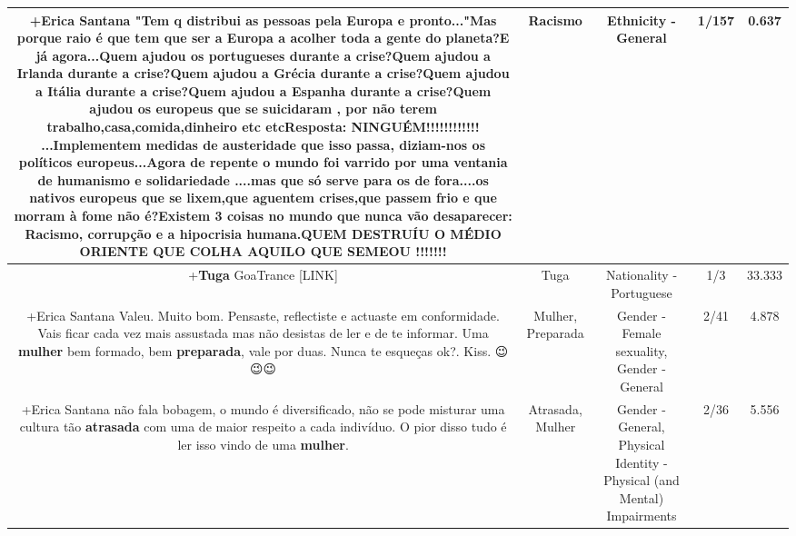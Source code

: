 \documentclass[11pt]{article}
\newlength\mylength
\begin{document}
\begin{center}
\begin{longtable}{|C{.65\mylength}|C{.30\mylength}|C{.12\mylength}|C{.12\mylength}|C{.12\mylength}|}
  \small +Erica Santana "Tem q  distribui as pessoas pela Europa e pronto..."Mas porque raio é que tem que ser a Europa a acolher toda a gente do planeta?E já agora...Quem ajudou os portugueses durante a crise?Quem ajudou a Irlanda  durante a crise?Quem ajudou a Grécia durante a crise?Quem ajudou a Itália durante a crise?Quem ajudou a Espanha durante a crise?Quem ajudou os europeus que se suicidaram , por não terem trabalho,casa,comida,dinheiro etc etcResposta:  NINGUÉM!!!!!!!!!!!! ...Implementem medidas de austeridade que isso passa, diziam-nos os políticos europeus...Agora de repente o mundo foi varrido por uma ventania de humanismo e solidariedade ....mas que só serve para os de fora....os nativos europeus que se lixem,que aguentem crises,que passem frio e que morram à fome não é?Existem 3 coisas no mundo que nunca vão desaparecer: \textbf{Racismo}, corrupção e a hipocrisia humana.QUEM DESTRUÍU O MÉDIO ORIENTE QUE COLHA AQUILO QUE SEMEOU !!!!!!!\normalsize   & Racismo & Ethnicity - General & 1/157 & 0.637 \\  \hline
  \small +\textbf{Tuga} GoaTrance  [LINK] \normalsize   & Tuga & Nationality - Portuguese & 1/3 & 33.333 \\  \hline
  \small +Erica Santana  Valeu. Muito bom. Pensaste, reflectiste e actuaste em conformidade. Vais ficar cada vez mais assustada mas não desistas de ler e de te informar. Uma \textbf{mulher} bem formado, bem \textbf{preparada}, vale por duas. Nunca te esqueças ok?. Kiss.  😉😉😉\normalsize   & Mulher, Preparada & Gender - Female sexuality, Gender - General & 2/41 & 4.878 \\  \hline
  \small +Erica Santana não fala bobagem, o mundo é diversificado, não se pode misturar uma cultura tão \textbf{atrasada} com uma de maior respeito a cada indivíduo. O pior disso tudo é ler isso vindo de uma \textbf{mulher}.\normalsize   & Atrasada, Mulher & Gender - General, Physical Identity - Physical (and Mental) Impairments & 2/36 & 5.556 \\  \hline

\end{longtable}
\end{center}
\end{document}
